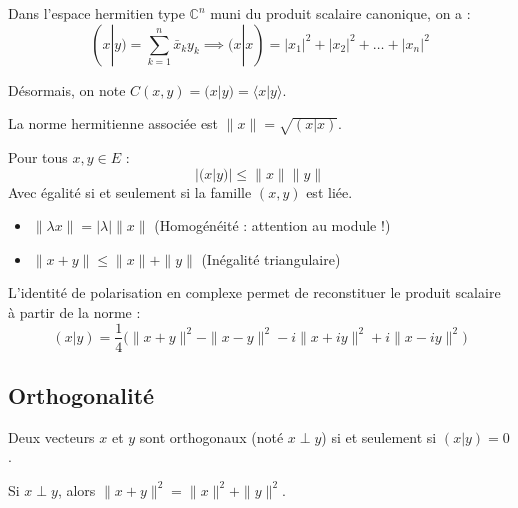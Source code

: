 \documentclass[french]{yLectureNote}
\begin{document}
Dans l'espace hermitien type $\mathbb{C}^n$ muni du produit scalaire canonique, on a :
$$(x|y) = \sum_{k=1}^n \bar{x}_k y_k \implies (x|x) = |x_1|^2 + |x_2|^2 + \dots + |x_n|^2$$

\begin{definition}[Notation]
    Désormais, on note $C(x, y) = (x|y) = \langle x|y \rangle$.
\end{definition}

\begin{definition}[Norme]
    La norme hermitienne associée est $\|x\| = \sqrt{(x|x)}$.
\end{definition}

\begin{theorem}
    Pour tous $x, y \in E$ :
    $$|(x|y)| \leq \|x\| \|y\|$$
    Avec égalité si et seulement si la famille $(x, y)$ est liée.
\end{theorem}
\begin{theorem}
\begin{itemize}
    \item $\|\lambda x\| = |\lambda| \|x\|$ (Homogénéité : attention au module !)
    \item $\|x+y\| \leq \|x\| + \|y\|$ (Inégalité triangulaire)
\end{itemize}
\end{theorem}

\begin{proposition}
    L'identité de polarisation en complexe permet de reconstituer le produit scalaire à partir de la norme :
    $$(x|y) = \frac{1}{4} \big(\|x+y\|^2 - \|x-y\|^2 - i\|x+iy\|^2 + i\|x-iy\|^2\big)$$
\end{proposition}

\subsection{Orthogonalité}

\begin{definition}
    Deux vecteurs $x$ et $y$ sont orthogonaux (noté $x \perp y$) si et seulement si $(x|y) = 0$.
\end{definition}


\begin{theorem}
    Si $x \perp y$, alors $\|x+y\|^2 = \|x\|^2 + \|y\|^2$.
\end{theorem}
\end{document}

